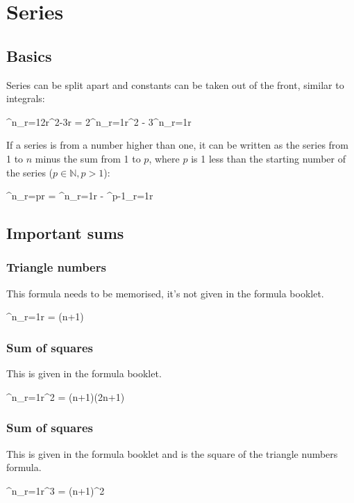 \section{Series}
\subsection{Basics}
Series can be split apart and constants can be taken out of the front, similar to integrals:
\begin{ea}
	\sum^{n}_{r=1}{2r^2-3r} = 2\sum^{n}_{r=1}{r^2} - 3\sum^{n}_{r=1}{r}
\end{ea}

If a series is from a number higher than one, it can be written as the series from 1 to $n$ minus the sum from 1 to $p$, where $p$ is 1 less than the starting number of the series ($p \in \mathbb{N}, p > 1$):
\begin{ea}
	\sum^{n}_{r=p}{r} = \sum^{n}_{r=1}{r} - \sum^{p-1}_{r=1}{r}
\end{ea}

\subsection{Important sums}
\subsubsection{Triangle numbers}
This formula needs to be memorised, it's not given in the formula booklet.
\begin{ea}
	\sum^{n}_{r=1}{r} = (n+1)
\end{ea}

\subsubsection{Sum of squares}
This is given in the formula booklet.
\begin{ea}
	\sum^{n}_{r=1}{r^2} = (n+1)(2n+1)
\end{ea}

\subsubsection{Sum of squares}
This is given in the formula booklet and is the square of the triangle numbers formula.
\begin{ea}
	\sum^{n}_{r=1}{r^3} = (n+1)^2
\end{ea}
